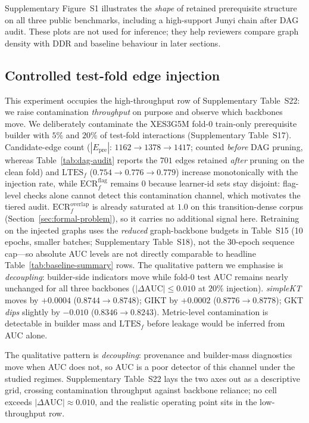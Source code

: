 \documentclass[preprint,10pt,doubleblind]{elsarticle}
\newcommand{\Epre}{\ensuremath{E_{\text{pre}}}}
\newcommand{\DDR}{\textsc{DDR}}
\begin{document}
Supplementary Figure~S1 illustrates the
\emph{shape} of retained prerequisite structure on all three public benchmarks,
including a high-support Junyi chain after DAG audit. These plots are not used
for inference; they help reviewers compare graph density with \DDR{} and
baseline behaviour in later sections.

\subsection{Controlled test-fold edge injection}
\label{sec:exp-injection}
This experiment occupies the high-throughput row of
Supplementary Table~S22: we raise contamination
\emph{throughput} on purpose and observe which backbones move. We
deliberately contaminate the XES3G5M fold-0 train-only prerequisite builder
with $5\%$ and $20\%$ of test-fold interactions (Supplementary Table~S17).
Candidate-edge count ($|\Epre|$: $1162{\to}1378{\to}1417$; counted
\emph{before} DAG pruning, whereas Table~\ref{tab:dag-audit} reports the
$701$ edges retained \emph{after} pruning on the clean fold) and
$\mathrm{LTES}_f$ ($0.754{\to}0.776{\to}0.779$) increase monotonically with
the injection rate, while $\mathrm{ECR}^{\mathrm{flag}}_f$ remains $0$
because learner-id sets stay disjoint: flag-level checks alone cannot detect
this contamination channel, which motivates the tiered audit.
$\mathrm{ECR}^{\mathrm{overlap}}_f$ is already saturated at $1.0$ on this
transition-dense corpus (Section~\ref{sec:formal-problem}), so it carries no
additional signal here. Retraining on the injected graphs uses the \emph{reduced}
graph-backbone budgets in Table~S15 (10 epochs, smaller batches; Supplementary
Table~S18), not the 30-epoch sequence cap---so absolute AUC levels are not
directly comparable to headline Table~\ref{tab:baseline-summary} rows. The
qualitative pattern we emphasise is \emph{decoupling}: builder-side indicators
move while fold-0 test AUC remains nearly unchanged for all three backbones
($|\Delta\text{AUC}|{\leq}0.010$ at $20\%$ injection). \textit{simpleKT} moves by ${+}0.0004$ ($0.8744{\to}0.8748$);
GIKT by ${+}0.0002$ ($0.8776{\to}0.8778$); GKT \emph{dips} slightly by
${-}0.010$ ($0.8346{\to}0.8243$). Metric-level contamination is detectable in
builder mass and $\mathrm{LTES}_f$ before leakage would be inferred
from AUC alone.

The qualitative pattern is \emph{decoupling}: provenance and builder-mass
diagnostics move when AUC does not, so AUC is a poor detector of this channel
under the studied regimes. Supplementary Table~S22 lays the two axes out as a
descriptive grid, crossing contamination throughput against backbone reliance;
no cell exceeds $|\Delta\text{AUC}|{\approx}0.010$, and the realistic operating
point sits in the low-throughput row.
\end{document}
